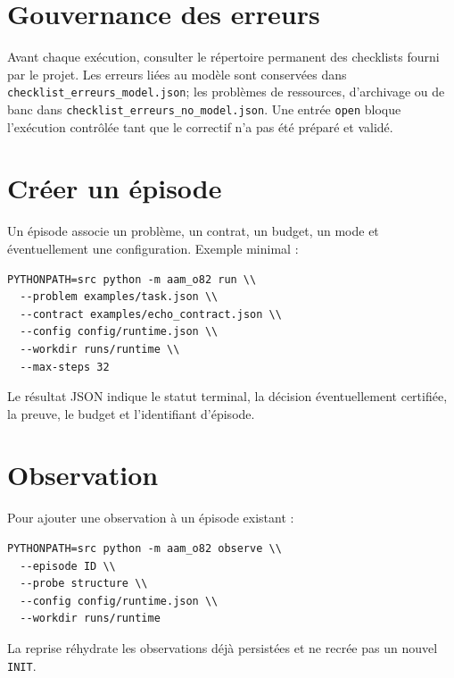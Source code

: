 \documentclass[11pt,a4paper]{report}
\begin{document}
\chapter{Gouvernance des erreurs}
Avant chaque exécution, consulter le répertoire permanent des checklists fourni par le projet. Les erreurs liées au modèle sont conservées dans \texttt{checklist\_erreurs\_model.json}; les problèmes de ressources, d'archivage ou de banc dans \texttt{checklist\_erreurs\_no\_model.json}. Une entrée \texttt{open} bloque l'exécution contrôlée tant que le correctif n'a pas été préparé et validé.

\chapter{Créer un épisode}
Un épisode associe un problème, un contrat, un budget, un mode et éventuellement une configuration. Exemple minimal :
\begin{verbatim}
PYTHONPATH=src python -m aam_o82 run \\
  --problem examples/task.json \\
  --contract examples/echo_contract.json \\
  --config config/runtime.json \\
  --workdir runs/runtime \\
  --max-steps 32
\end{verbatim}
Le résultat JSON indique le statut terminal, la décision éventuellement certifiée, la preuve, le budget et l'identifiant d'épisode.

\chapter{Observation}
Pour ajouter une observation à un épisode existant :
\begin{verbatim}
PYTHONPATH=src python -m aam_o82 observe \\
  --episode ID \\
  --probe structure \\
  --config config/runtime.json \\
  --workdir runs/runtime
\end{verbatim}
La reprise réhydrate les observations déjà persistées et ne recrée pas un nouvel \texttt{INIT}.
\end{document}
